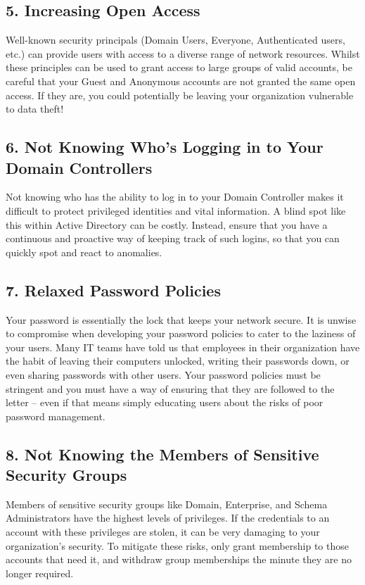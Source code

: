 \subsection{5. Increasing Open Access}
Well-known security principals (Domain Users, Everyone, Authenticated users, etc.) can provide users with access to a diverse range of network resources. Whilst these principles can be used to grant access to large groups of valid accounts, be careful that your Guest and Anonymous accounts are not granted the same open access. If they are, you could potentially be leaving your organization vulnerable to data theft!

\subsection{6. Not Knowing Who’s Logging in to Your Domain Controllers}
Not knowing who has the ability to log in to your Domain Controller makes it difficult to protect privileged identities and vital information. A blind spot like this within Active Directory can be costly. Instead, ensure that you have a continuous and proactive way of keeping track of such logins, so that you can quickly spot and react to anomalies.

\subsection{7. Relaxed Password Policies}
Your password is essentially the lock that keeps your network secure. It is unwise to compromise when developing your password policies to cater to the laziness of your users. Many IT teams have told us that employees in their organization have the habit of leaving their computers unlocked, writing their passwords down, or even sharing passwords with other users. Your password policies must be stringent and you must have a way of ensuring that they are followed to the letter – even if that means simply educating users about the risks of poor password management.

\subsection{8. Not Knowing the Members of Sensitive Security Groups}
Members of sensitive security groups like Domain, Enterprise, and Schema Administrators have the highest levels of privileges. If the credentials to an account with these privileges are stolen, it can be very damaging to your organization’s security. To mitigate these risks, only grant membership to those accounts that need it, and withdraw group memberships the minute they are no longer required.

